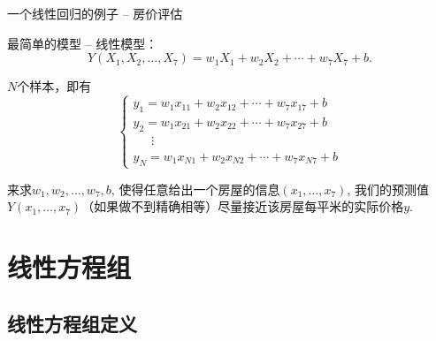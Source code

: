 \begin{frame}{一个线性回归的例子 -- 房价评估}

最简单的模型 -- 线性模型：
\[Y(X_1,X_2,\ldots,X_7) = w_1X_1 + w_2X_2 + \cdots + w_7X_7 + b.\]

\pause

$N$个样本，即有
\[
\begin{cases}
y_1 = w_1x_{11} + w_2x_{12} + \cdots + w_7x_{17} + b \\
y_2 = w_1x_{21} + w_2x_{22} + \cdots + w_7x_{27} + b \\
\phantom{yyy} \vdots \\
y_N = w_1x_{N1} + w_2x_{N2} + \cdots + w_7x_{N7} + b
\end{cases}\]

\pause

来求$w_1,w_2,\ldots,w_7,b$, 使得任意给出一个房屋的信息$(x_1,\ldots,x_7)$, 我们的预测值$Y(x_1,\ldots,x_7)$（如果做不到精确相等）尽量接近该房屋每平米的实际价格$y$.

\end{frame}


\section{线性方程组}

\subsection{线性方程组定义}


